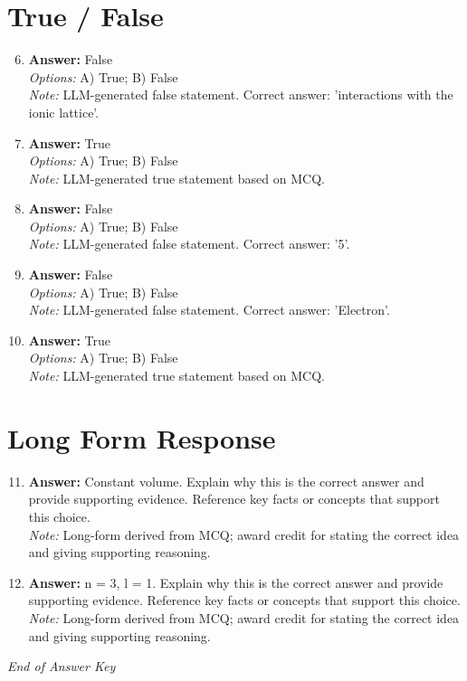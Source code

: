 \documentclass[12pt]{article}
\begin{document}
\section*{True / False}
\begin{enumerate}[label=\arabic*.]
\setcounter{enumi}{5}
\item \textbf{Answer:} False
\\ \textit{Options:} A) True; B) False
\\ \textit{Note:} LLM-generated false statement. Correct answer: 'interactions with the ionic lattice'.
\item \textbf{Answer:} True
\\ \textit{Options:} A) True; B) False
\\ \textit{Note:} LLM-generated true statement based on MCQ.
\item \textbf{Answer:} False
\\ \textit{Options:} A) True; B) False
\\ \textit{Note:} LLM-generated false statement. Correct answer: '5'.
\item \textbf{Answer:} False
\\ \textit{Options:} A) True; B) False
\\ \textit{Note:} LLM-generated false statement. Correct answer: 'Electron'.
\item \textbf{Answer:} True
\\ \textit{Options:} A) True; B) False
\\ \textit{Note:} LLM-generated true statement based on MCQ.
\end{enumerate}

\section*{Long Form Response}
\begin{enumerate}[label=\arabic*.]
\setcounter{enumi}{10}
\item \textbf{Answer:} Constant volume. Explain why this is the correct answer and provide supporting evidence. Reference key facts or concepts that support this choice.
\\ \textit{Note:} Long-form derived from MCQ; award credit for stating the correct idea and giving supporting reasoning.
\item \textbf{Answer:} n = 3, l = 1. Explain why this is the correct answer and provide supporting evidence. Reference key facts or concepts that support this choice.
\\ \textit{Note:} Long-form derived from MCQ; award credit for stating the correct idea and giving supporting reasoning.
\end{enumerate}

\vfill
\noindent\textit{End of Answer Key}
\end{document}

